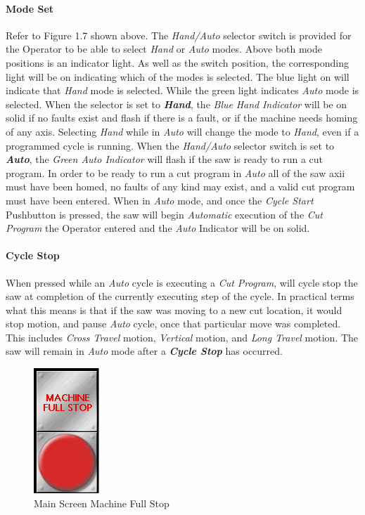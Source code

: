 \paragraph*{Mode Set} Refer to Figure 1.7 shown above. The \textit{Hand/Auto} selector switch is provided for the Operator to be able to select \textit{Hand} or \textit{Auto} modes. Above both mode positions is an indicator light. As well as the switch position, the corresponding light will be on indicating which of the modes is selected. The blue light on will indicate that \textit{Hand} mode is selected. While the green light indicates \textit{Auto} mode is selected. When the selector is set to \textbf{\textit{Hand}}, the \textit{Blue} \textit{Hand} \textit{Indicator} will be on solid if no faults exist and flash if there is a fault, or if the machine needs homing of any axis. Selecting \textit{Hand} while in \textit{Auto} will change the mode to \textit{Hand}, even if a programmed cycle is running. When the \textit{Hand/Auto} selector switch is set to \textbf{\textit{Auto}}, the \textit{Green Auto Indicator} will flash if the saw is ready to run a cut program. In order to be ready to run a cut program in \textit{Auto} all of the saw axii must have been homed, no faults of any kind may exist, and a valid cut program must have been entered. When in \textit{Auto} mode, and once the \textit{Cycle Start} Pushbutton is pressed, the saw will begin \textit{Automatic} execution of the \textit{Cut Program} the Operator entered and the \textit{Auto} Indicator will be on solid.
\paragraph*{Cycle Stop} When pressed while an \textit{Auto} cycle is executing a \textit{Cut Program}, will cycle stop the saw at completion of the currently executing step of the cycle. In practical terms what this means is that if the saw was moving to a new cut location, it would stop motion, and pause \textit{Auto} cycle, once that particular move was completed. This includes \textit{Cross Travel} motion, \textit{Vertical} motion, and \textit{Long Travel} motion. The saw will remain in \textit{Auto} mode after a \textbf{\textit{Cycle Stop}} has occurred.
\begin{figure}
	\centering
	\includegraphics[width=.2\linewidth]{screen-captures/main-screen-mach-full-stop}
	\caption{Main Screen Machine Full Stop}
	\label{fig:main-mach-full-stop}
\end{figure}
